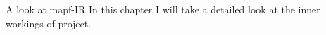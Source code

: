 \chap A look at mapf-IR
In this chapter I will take a detailed look at the inner workings of \mapfIR project.